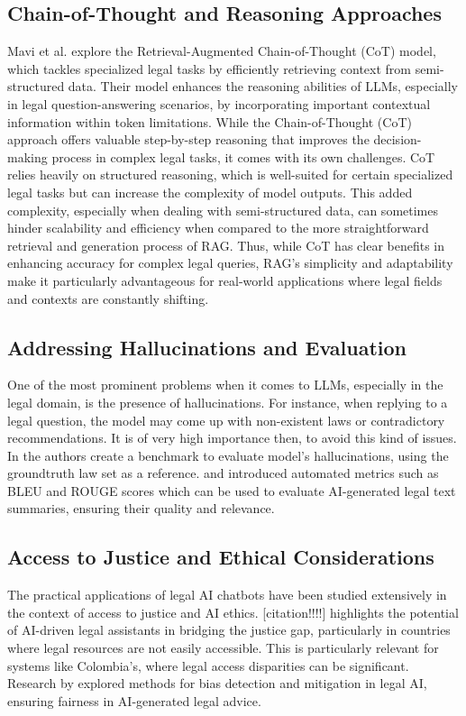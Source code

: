 \subsection{Chain-of-Thought and Reasoning Approaches}
Mavi et al. \cite{mavi2023retrievalaugmentedchainofthoughtsemistructureddomains} 
explore the Retrieval-Augmented Chain-of-Thought (CoT) model, which tackles specialized 
legal tasks by efficiently retrieving context from semi-structured data. Their model 
enhances the reasoning abilities of LLMs, especially in legal question-answering 
scenarios, by incorporating important contextual information within token limitations.
While the Chain-of-Thought (CoT) approach offers valuable step-by-step reasoning that 
improves the decision-making process in complex legal tasks, it comes with its own challenges. 
CoT relies heavily on structured reasoning, which is well-suited for certain specialized legal tasks 
but can increase the complexity of model outputs. This added complexity, especially when dealing with 
semi-structured data, can sometimes hinder scalability and efficiency when compared to the more straightforward 
retrieval and generation process of RAG. Thus, while CoT has clear benefits in enhancing accuracy for complex 
legal queries, RAG's simplicity and adaptability make it particularly advantageous for real-world applications 
where legal fields and contexts are constantly shifting.
\subsection{Addressing Hallucinations and Evaluation}
One of the most prominent problems when it comes to LLMs, especially in the legal domain, 
is the presence of hallucinations. For instance, when replying to a legal question, 
the model may come up with non-existent laws or contradictory recommendations. 
It is of very high importance then, to avoid this kind of issues. 
In \cite{hu2025finetuninglargelanguagemodels} the authors create a benchmark 
to evaluate model's hallucinations, using the groundtruth law set as a reference.
\cite{Papineni_bleu} and \cite{lin-2004-rouge} introduced automated metrics 
such as BLEU and ROUGE scores which can be used to evaluate AI-generated 
legal text summaries, ensuring their quality and relevance.
\subsection{Access to Justice and Ethical Considerations}
The practical applications of legal AI chatbots have been studied extensively 
in the context of access to justice and AI ethics. 
[citation!!!!] highlights the potential of AI-driven legal assistants in bridging 
the justice gap, particularly in countries where legal resources are not easily 
accessible. This is particularly relevant for systems like Colombia's, 
where legal access disparities can be significant. 
Research by \cite{Min_bias} explored methods for bias detection and mitigation 
in legal AI, ensuring fairness in AI-generated legal advice.
